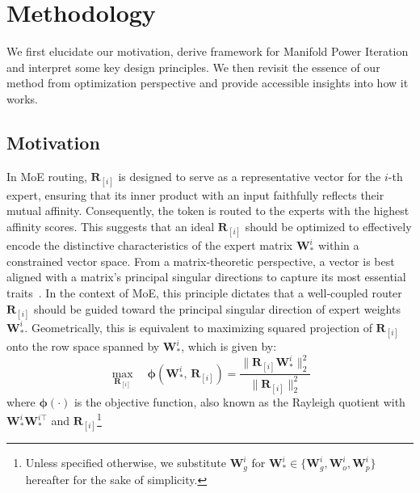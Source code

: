 \documentclass{llmxive}
\providecommand{\bm}[1]{\boldsymbol{#1}}
\providecommand{\mR}{{\bm{R}}}
\providecommand{\mW}{{\bm{W}}}
\begin{document}
\section{Methodology}
We first elucidate our motivation, derive framework for Manifold Power Iteration and interpret some key design principles.
We then revisit the essence of our method from optimization perspective and provide accessible insights into how it works.

\subsection{Motivation}
\label{sec:motivation}
In MoE routing, \(\mathbf{R}_{[i]}\) is designed to serve as a representative vector for the \(i\)-th expert, ensuring that its inner product with an input faithfully reflects their mutual affinity. 
Consequently, the token is routed to the experts with the highest affinity scores.
This suggests that an ideal \(\mR_{[i]}\) should be optimized to effectively encode the distinctive characteristics of the expert matrix \(\mW_*^i\) within a constrained vector space. 
From a matrix-theoretic perspective, a vector is best aligned with a matrix’s principal singular directions to capture its most essential traits~\cite{Eckart1936TheAO}. 
In the context of MoE, this principle dictates that a well-coupled router \(\mR_{[i]}\) should be guided toward the principal singular direction of expert weights $\mW_*^i$. 
Geometrically, this is equivalent to maximizing squared projection of \(\mathbf{R}_{[i]}\) onto the row space spanned by \(\mathbf{W}_*^i\), which is given by:
\begin{equation}
    \max_{\mR_{[i]}} \quad {\bm{\phi}(\mW_{*}^i, \, \mR_{[i]}) = \frac{\|\mR_{[i]}\mW_*^i\|_2^2}{\|\mR_{[i]}\|_2^2}} 
    \label{eq:objective} 
\end{equation}
where $\bm{\phi}(\cdot)$ is the objective function, also known as the Rayleigh quotient with  $\mW_*^i\mW_*^{i\top}$ and $\mR_{[i]}$\footnote{
Unless specified otherwise, we substitute $\mathbf{W}_g^i$ for $\mathbf{W}_*^i \in \{\mathbf{W}_g^i, \mathbf{W}_o^i, \mathbf{W}_p^i\}$ hereafter for the sake of simplicity.
}
\end{document}
